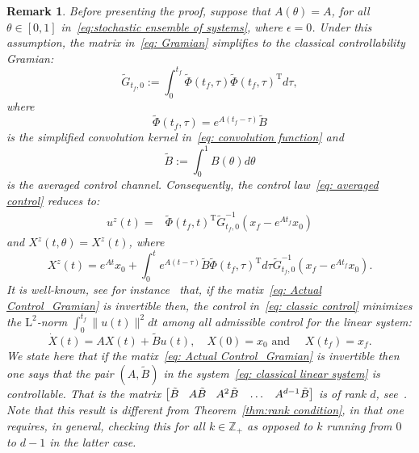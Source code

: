 \documentclass[12pt]{amsart}
\newtheorem{remark}{Remark}[section]
\renewcommand{\(}{\left (}
\renewcommand{\)}{\right )}
\numberwithin{equation}{section}
\begin{document}
\begin{remark}
Before presenting the proof, suppose that $A(\theta)=A$, for all $\theta\in[0,1]$ in~\eqref{eq:stochastic ensemble of systems}, where $\epsilon=0$. Under this assumption, the matrix in~\eqref{eq: Gramian} simplifies to the classical controllability Gramian:
\begin{equation}\label{eq: Actual Control_Gramian}
\tilde{G}_{t_f,0}:=\int_{0}^{t_f}\tilde{\Phi}(t_f,\tau)\tilde{\Phi}(t_f,\tau)^{\mathrm{T}}d\tau,    
\end{equation}
where   
\[
\tilde{\Phi}(t_f,\tau)=e^{A(t_f-\tau)}\tilde{B}
\]
is the simplified convolution kernel in~\eqref{eq: convolution function} and
\[
\tilde{B}:=\int_{0}^{1}B(\theta)d\theta
\]
is the averaged control channel. Consequently, the control law~\eqref{eq: averaged control} reduces to:
\begin{align}\label{eq: classic control}
u^z(t)=&\tilde{\Phi}(t_f,t)^{\mathrm{T}} \tilde{G}_{t_f,0}^{-1}\left(x_f-e^{At_f} x_0\right)
\end{align}
and $X^z(t,\theta)=X^z(t)$, where
\begin{equation*}%
X^z(t)=e^{At} x_0+\int_{0}^{t}e^{A(t-\tau)}\tilde{B}\tilde{\Phi}(t_f,\tau)^{\mathrm{T}}d\tau \tilde{G}_{t_f,0}^{-1}\left(x_f-e^{At_f} x_0\right).   
\end{equation*}
It is well-known, see for instance~\cite[pp.~137]{RWB:15} that, if the matix~\eqref{eq: Actual Control_Gramian} is invertible then, the control in~\eqref{eq: classic control} minimizes the $\mathrm{L}^2$-norm $\int_0^{t_f}\|u(t)\|^2dt$ among all admissible control for the linear system:
\begin{equation}\label{eq: classical linear system}
\dot{X}(t)=AX(t)+\tilde{B}u(t),\quad X(0)=x_0\text{ and }\quad X(t_f)=x_f. 
\end{equation}
We state here that if the matix~\eqref{eq: Actual Control_Gramian} is invertible then one says that the pair $(A,\tilde{B})$ in the system~\eqref{eq: classical linear system} is controllable. That is the matrix $\begin{bmatrix}
\tilde{B}\hspace{3mm} A\tilde{B}\hspace{3mm} A^2\tilde{B}\hspace{3mm}\dots\hspace{3mm}A^{d-1}\tilde{B}    
\end{bmatrix}$ is of rank $d$, see~\cite[Theorem~5]{EBL-LM:67}. Note that this result is different from Theorem~\ref{thm:rank condition}, in that one requires, in general, checking this for all $k\in\mathbb{Z}_+$ as opposed to $k$ running from $0$ to $d-1$ in the latter case.
    
\end{remark}
\end{document}
